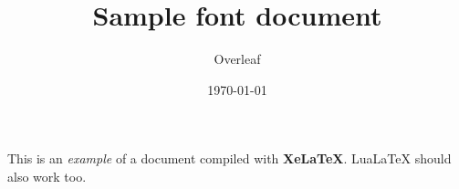 \documentclass[12pt]{article}
\title{Sample font document}
\author{Overleaf}
\date{\today}
\begin{document}
\maketitle

This is an \textit{example} of a document compiled
with \textbf{XeLaTeX}. LuaLaTeX should also work too.
\end{document}
